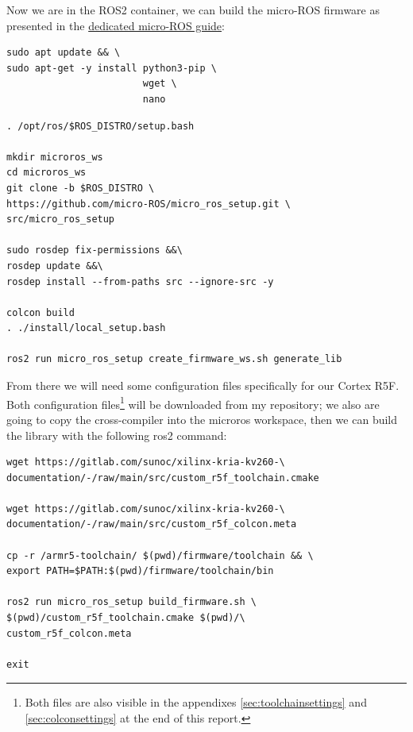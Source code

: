 \documentclass[10pt]{article}
\begin{document}
Now we are in the ROS2 container, we can build the micro-ROS firmware as presented in the \href{https://micro.ros.org/docs/tutorials/advanced/create\_custom\_static\_library}{dedicated micro-ROS guide}:
\begin{tcolorbox}
\begin{verbatim}
sudo apt update && \
sudo apt-get -y install python3-pip \
                        wget \
                        nano
\end{verbatim}
\end{tcolorbox}

\begin{tcolorbox}
\begin{verbatim}
. /opt/ros/$ROS_DISTRO/setup.bash

mkdir microros_ws
cd microros_ws
git clone -b $ROS_DISTRO \
https://github.com/micro-ROS/micro_ros_setup.git \
src/micro_ros_setup

sudo rosdep fix-permissions &&\
rosdep update &&\
rosdep install --from-paths src --ignore-src -y

colcon build
. ./install/local_setup.bash

ros2 run micro_ros_setup create_firmware_ws.sh generate_lib
\end{verbatim}
\end{tcolorbox}


From there we will need some configuration files specifically for
our Cortex R5F. Both configuration files\footnote{Both files are also visible in the appendixes \ref{sec:toolchainsettings} and \ref{sec:colconsettings} at the end of this report.} will be downloaded from my repository;
we also are going to copy the cross-compiler into the microros workspace,
then we can build the library with the following ros2 command:
\begin{tcolorbox}
\begin{verbatim}
wget https://gitlab.com/sunoc/xilinx-kria-kv260-\
documentation/-/raw/main/src/custom_r5f_toolchain.cmake

wget https://gitlab.com/sunoc/xilinx-kria-kv260-\
documentation/-/raw/main/src/custom_r5f_colcon.meta

cp -r /armr5-toolchain/ $(pwd)/firmware/toolchain && \
export PATH=$PATH:$(pwd)/firmware/toolchain/bin

ros2 run micro_ros_setup build_firmware.sh \
$(pwd)/custom_r5f_toolchain.cmake $(pwd)/\
custom_r5f_colcon.meta

exit
\end{verbatim}
\end{tcolorbox}
\end{document}
